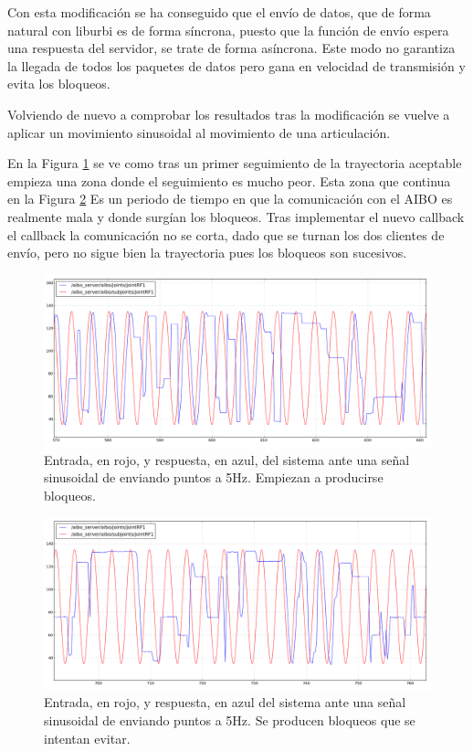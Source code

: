 \documentclass[12pt,a4paper,final,twoside]{article}
\begin{document}
Con esta modificación se ha conseguido que el envío de datos, que de forma natural con liburbi es de forma síncrona, puesto que la función de envío espera una respuesta del servidor, se trate de forma asíncrona. Este modo no garantiza la llegada de todos los paquetes de datos pero gana en velocidad de transmisión y evita los bloqueos.

Volviendo de nuevo a comprobar los resultados tras la modificación se vuelve a aplicar un movimiento sinusoidal al movimiento de una articulación.

En la Figura \ref{fig:ASempiezamala} se ve como tras un primer seguimiento de la trayectoria aceptable empieza una zona donde el seguimiento es mucho peor. Esta zona que continua en la Figura \ref{fig:ASpeor} Es un periodo de tiempo en que la comunicación con el AIBO es realmente mala y donde surgían los bloqueos. Tras implementar el nuevo callback el callback la comunicación no se corta, dado que se turnan los dos clientes de envío, pero no sigue bien la trayectoria pues los bloqueos son sucesivos.

\begin{figure}[H]
	\centering
    \includegraphics[scale=0.375]{images/sinlegWR/mejorado/empiezamala.png}
 	\caption{Entrada, en rojo, y respuesta, en azul, del sistema ante una señal sinusoidal de enviando puntos a 5Hz. Empiezan a producirse bloqueos.}
  \label{fig:ASempiezamala}
\end{figure}
\begin{figure}[H]
	\centering
    \includegraphics[scale=0.375]{images/sinlegWR/mejorado/peora5hz.png}
 	\caption{Entrada, en rojo, y respuesta, en azul del sistema ante una señal sinusoidal de enviando puntos a 5Hz. Se producen bloqueos que se intentan evitar.}
  \label{fig:ASpeor}
\end{figure}
\end{document}
